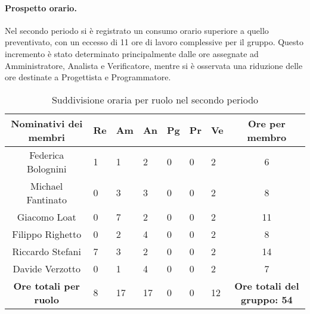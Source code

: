 \paragraph{Prospetto orario.}
Nel secondo periodo si è registrato un consumo orario superiore a quello preventivato, con un eccesso di 11 ore di lavoro complessive per il gruppo. Questo incremento è stato determinato principalmente dalle ore assegnate ad Amministratore, Analista e Verificatore, mentre si è osservata una riduzione delle ore destinate a Progettista e Programmatore.
\begin{table}[h!]
    \centering
    \renewcommand{\arraystretch}{1.5}
    \begin{tabularx}{\textwidth}{|c|X|X|X|X|X|X|c|}\hline
    \rowcolor[HTML]{FFD700} 
    \textbf{Nominativi dei membri} & \textbf{Re} & \textbf{Am} & \textbf{An} & \textbf{Pg} & \textbf{Pr} & \textbf{Ve} & \textbf{Ore per membro} \\ \hline
    Federica Bolognini & 1 & 1 & 2 & 0 & 0 & 2 & 6  \\ \hline
    Michael Fantinato  & 0 & 3 & 3 & 0 & 0 & 2 & 8  \\ \hline
    Giacomo Loat       & 0 & 7 & 2 & 0 & 0 & 2 & 11 \\ \hline
    Filippo Righetto   & 0 & 2 & 4 & 0 & 0 & 2 & 8  \\ \hline
    Riccardo Stefani   & 7 & 3 & 2 & 0 & 0 & 2 & 14 \\ \hline
    Davide Verzotto    & 0 & 1 & 4 & 0 & 0 & 2 & 7  \\ \hline
    \rowcolor[HTML]{FFD700} 
    \textbf{Ore totali per ruolo} & 8 & 17 & 17 & 0 & 0 & 12 & \textbf{Ore totali del gruppo: 54} \\ \hline
    \end{tabularx}
    \caption{Suddivisione oraria per ruolo nel secondo periodo}
\end{table}


